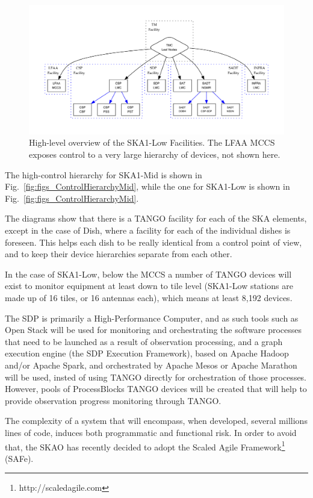 \documentclass[a4paper,
               biblatex,       %
               keeplastbox,    %
               ]{jacow-2_1}    %
\begin{document}
\begin{figure}[!tb]
  \centering
    \includegraphics[width=\textwidth]{figs/ControlHierarchyLow}
  \caption{High-level overview of the SKA1-Low Facilities. The LFAA MCCS exposes control to a very large hierarchy of devices, not shown here.}
  \label{fig:figs_ControlHierarchyLow}
\end{figure}

The high-control hierarchy for SKA1-Mid is shown in Fig.~\ref{fig:figs_ControlHierarchyMid}, while the one for SKA1-Low is shown in Fig.~\ref{fig:figs_ControlHierarchyMid}.

The diagrams show that there is a TANGO facility for each of the SKA elements, except in the case of Dish, where a facility for each of the individual dishes is foreseen. This helps each dish to be really identical from a control point of view, and to keep their device hierarchies separate from each other.

In the case of SKA1-Low, below the MCCS a number of TANGO devices will exist to monitor equipment at least down to tile level (SKA1-Low stations are made up of 16 tiles, or 16 antennas each), which means at least 8,192 devices.

The SDP is primarily a High-Performance Computer, and as such tools such as Open Stack will be used for monitoring and orchestrating the software processes that need to be launched as a result of observation processing, and a graph execution engine (the SDP Execution Framework), based on Apache Hadoop and/or Apache Spark, and orchestrated by Apache Mesos or Apache Marathon will be used, insted of using TANGO directly for orchestration of those processes. However, pools of ProcessBlocks TANGO devices will be created that will help to provide observation progress monitoring through TANGO.

The complexity of a system that will encompass, when developed, several millions lines of code, induces both programmatic and functional risk. In order to avoid that, the SKAO has recently decided to adopt the Scaled Agile Framework\footnote{http://scaledagile.com} (SAFe).
\end{document}
